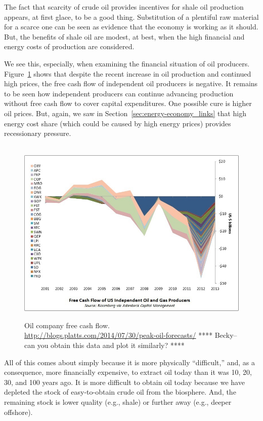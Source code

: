 The fact that scarcity of crude oil provides incentives for shale oil production
appears, at first glace, to be a good thing.
Substitution of a plentiful raw material for a scarce one 
can be seen as evidence that the economy is working as it should.
But, the benefits of shale oil are modest, at best, when the
high financial and energy costs of production are considered.

We see this, especially, when examining the financial situation of oil producers.
Figure~\ref{fig:oil_company_free_cash_flow} 
shows that despite the recent increase in oil production
and continued high prices, 
the free cash flow of independent oil producers is negative.
It remains to be seen how independent producers can continue advancing 
production without free cash flow to cover capital expenditures.
One possible cure is higher oil prices.
But, again, we saw 
in Section~\ref{sec:energy-economy_links}
that high energy cost share 
(which could be caused by high energy prices)
provides recessionary pressure.

\begin{figure}[!ht]
\centering\
\includegraphics[width=\linewidth]{Part_0/Chapter_Introduction/images/Cash-Flow.jpg}
\caption[Oil company free cash flow]{Oil company free cash flow.
\url{http://blogs.platts.com/2014/07/30/peak-oil-forecasts/}
**** Becky--can you obtain this data and plot it similarly? ****
}
\label{fig:oil_company_free_cash_flow}
\end{figure}

All of this comes about simply because it is 
more physically ``difficult,'' and, as a consequence, 
more financially expensive, 
to extract oil today than it was 10, 20, 30, and 100 years ago.
It is more difficult to obtain oil today because we have depleted
the stock of easy-to-obtain crude oil from the biosphere.
And, the remaining stock is lower quality (e.g., shale)
or further away (e.g., deeper offshore).

